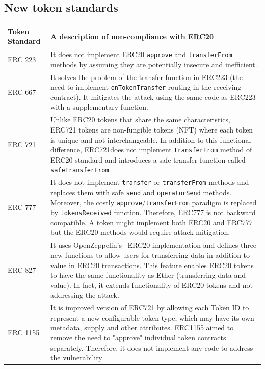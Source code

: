 
\subsection{New token standards}

\begin{table}
\centering
\begin{tabular}{|m{1.3cm}|m{15cm}|}
	\hline\centering
	Token Standard & A description of non-compliance with ERC20\\
	\hline\hline\centering
	ERC 223 \cite{Ref20} & It does not implement ERC20 \texttt{approve} and \texttt{transferFrom} methods by assuming they are potentially insecure and inefficient.\\ 
	\hline\centering 
	ERC 667 \cite{Ref21} & It solves the problem of the transfer function in ERC223 (\ie the need to implement \texttt{onTokenTransfer} routing in the receiving contract). It mitigates the attack using the same code as ERC223 with a supplementary function.\\ 
	\hline\centering 
	ERC 721 \cite{Ref22} & Unlike ERC20 tokens that share the same characteristics, ERC721 tokens are non-fungible tokens (NFT) where each token is unique and not interchangeable. In addition to this functional difference, ERC721does not implement \texttt{transferFrom} method of ERC20 standard and introduces a safe transfer function called \texttt{safeTransferFrom}.\\ 
	\hline\centering
	ERC 777 \cite{Ref23} & It does not implement \texttt{transfer} or \texttt{transferFrom} methods and replaces them with safe \texttt{send} and \texttt{operatorSend} methods. Moreover, the costly \texttt{approve}/\texttt{transferFrom} paradigm is replaced by \texttt{tokensReceived} function. Therefore, ERC777 is not backward compatible. A token might implement both ERC20 and ERC777 but the ERC20 methods would require attack mitigation.\\ 
	\hline\centering 
	ERC 827 \cite{Ref24} & It uses OpenZeppelin's~\cite{Ref10} ERC20 implementation and defines three new functions to allow users for transferring data in addition to value in ERC20 transactions. This feature enables ERC20 tokens to have the same functionality as Ether (transferring data and value). In fact, it extends functionality of ERC20 tokens and not addressing the attack. \\ 
	\hline\centering 
	ERC 1155 \cite{Ref25} & It is improved version of ERC721 by allowing each Token ID to represent a new configurable token type, which may have its own metadata, supply and other attributes. ERC1155 aimed to remove the need to "approve" individual token contracts separately. Therefore, it does not implement any code to address the vulnerability\\ 

\end{tabular}
\end{table}

